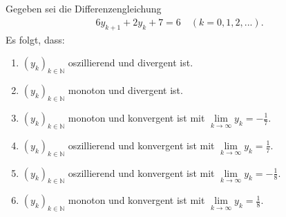 \subsection*{}
Gegeben sei die Differenzengleichung
\begin{align*}
6y_{k+1} + 2 y_k +7 = 6
\quad (k = 0,1,2,...).
\end{align*}
Es folgt, dass:
\renewcommand{\labelenumi}{(\alph{enumi})}
\begin{enumerate}
	\item
	$ (y_k)_{k \in \mathbb{N}} $ oszillierend und divergent ist.
	\item
	$ (y_k)_{k \in \mathbb{N}} $ monoton und divergent ist.	
	\item 
	$ (y_k)_{k \in \mathbb{N}} $ monoton und konvergent ist mit $ \lim \limits_{k \to \infty} y_k = -\frac{1}{7} $.
	\item
	$ (y_k)_{k \in \mathbb{N}} $ oszillierend und konvergent ist mit $ \lim \limits_{k \to \infty} y_k = \frac{1}{7} $.
	\item 
	$ (y_k)_{k \in \mathbb{N}} $ oszillierend und konvergent ist mit $ \lim \limits_{k \to \infty} y_k = -\frac{1}{8} $.
	\item 
	$ (y_k)_{k \in \mathbb{N}} $ monoton und konvergent ist mit $ \lim \limits_{k \to \infty} y_k = \frac{1}{8} $.
\end{enumerate}